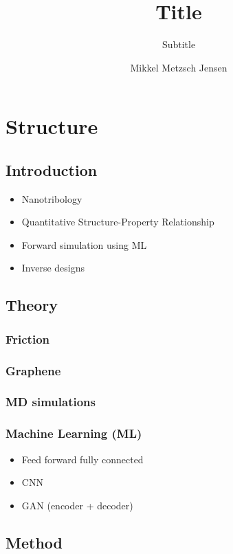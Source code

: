 \documentclass[UKenglish]{book}
\title{Title}
\subtitle{Subtitle}
\author{Mikkel Metzsch Jensen}
\begin{document}
\duoforside[dept={Department of Physics},
  program={Master's Program Name},
  long]                                         

\frontmatter{}


\tableofcontents{}

\mainmatter{}
\section*{Structure}   
\subsection*{Introduction}
\begin{itemize}
  \item Nanotribology
  \item Quantitative Structure-Property Relationship
  \item Forward simulation using ML
  \item Inverse designs
\end{itemize}
\subsection*{Theory}
\subsubsection*{Friction}
\subsubsection*{Graphene}
\subsubsection*{MD simulations}
\subsubsection*{Machine Learning (ML)}
\begin{itemize}
  \item Feed forward fully connected
  \item CNN
  \item GAN (encoder + decoder)
\end{itemize}


\subsection*{Method}
\end{document}
